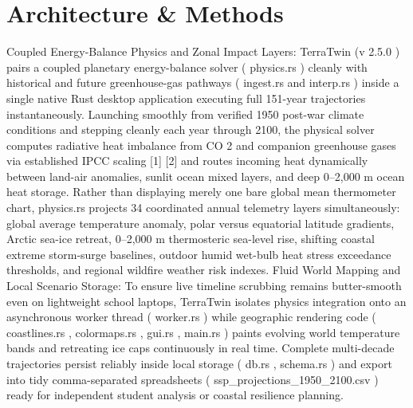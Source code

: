 \documentclass[10pt,letterpaper]{article}
\begin{document}
\section{Architecture \& Methods}
Coupled Energy-Balance Physics and Zonal Impact Layers: TerraTwin (v 2.5.0 ) pairs a coupled planetary energy-balance solver ( physics.rs ) cleanly with historical and future greenhouse-gas pathways ( ingest.rs and interp.rs ) inside a single native Rust desktop application executing full 151-year trajectories instantaneously. Launching smoothly from verified 1950 post-war climate conditions and stepping cleanly each year through 2100, the physical solver computes radiative heat imbalance from CO 2 and companion greenhouse gases via established IPCC scaling [1] [2] and routes incoming heat dynamically between land-air anomalies, sunlit ocean mixed layers, and deep 0--2,000 m ocean heat storage. Rather than displaying merely one bare global mean thermometer chart, physics.rs projects 34 coordinated annual telemetry layers simultaneously: global average temperature anomaly, polar versus equatorial latitude gradients, Arctic sea-ice retreat, 0--2,000 m thermosteric sea-level rise, shifting coastal extreme storm-surge baselines, outdoor humid wet-bulb heat stress exceedance thresholds, and regional wildfire weather risk indexes. Fluid World Mapping and Local Scenario Storage: To ensure live timeline scrubbing remains butter-smooth even on lightweight school laptops, TerraTwin isolates physics integration onto an asynchronous worker thread ( worker.rs ) while geographic rendering code ( coastlines.rs , colormaps.rs , gui.rs , main.rs ) paints evolving world temperature bands and retreating ice caps continuously in real time. Complete multi-decade trajectories persist reliably inside local storage ( db.rs , schema.rs ) and export into tidy comma-separated spreadsheets ( ssp\_projections\_1950\_2100.csv ) ready for independent student analysis or coastal resilience planning.
\end{document}
